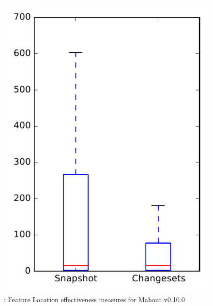 
\begin{figure}
\centering
\includegraphics[height=0.4\textheight]{figures/flt/rq1_mahout_no_outlier}
\caption{\fone: Feature Location effectiveness measures for Mahout v0.10.0}
\label{fig:flt:rq1:mahout}
\end{figure}
